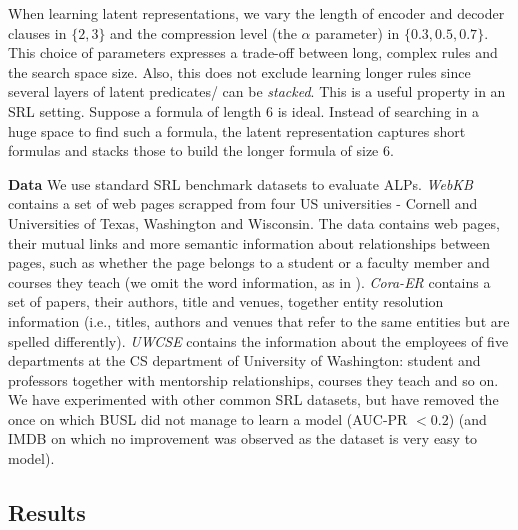 When learning latent representations, we vary the length of encoder and decoder clauses in $\{2,3\}$ and the compression level (the $\alpha$ parameter) in $\{0.3, 0.5, 0.7\}$.
This choice of parameters expresses a trade-off between long, complex rules and the search space size. 
Also, this does not exclude learning longer rules since several layers of latent predicates/ can be \textit{stacked}. 
This is a useful property in an SRL setting. 
Suppose a formula of length 6 is ideal. 
Instead of searching in a huge space to find such a formula, the latent representation captures short formulas and stacks those to build the longer formula of size 6.




\textbf{Data}
We use standard SRL benchmark datasets to evaluate ALPs.
\textit{WebKB} contains a set of web pages scrapped from four US universities - Cornell and Universities of Texas, Washington and Wisconsin.
The data contains web pages, their mutual links and more semantic information about relationships between pages, such as whether the page belongs to a student or a faculty member and courses they teach (we omit the word information, as in \cite{mihalkova:icml07}).
\textit{Cora-ER} contains a set of papers, their authors, title and venues, together entity resolution information (i.e., titles, authors and venues that refer to the same entities but are spelled differently).
\textit{UWCSE} contains the information about the employees of five departments at the CS department of University of Washington: student and professors together with mentorship relationships, courses they teach and so on.
We have experimented with other common SRL datasets, but have removed the once on which BUSL did not manage to learn a model (AUC-PR $< 0.2$) (and IMDB on which no improvement was observed as the dataset is very easy to model).








\subsection{Results}



